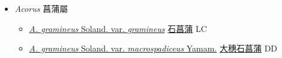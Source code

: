 
  \begin{itemize}
 \item[] \textit{Acorus} 菖蒲屬
                    
  \begin{itemize}
        \item[] \href{http://www.theplantlist.org/tpl1.1/search?q=Acorus+gramineus+var.+gramineus}{\textit{A. gramineus} Soland. var. \textit{gramineus}}   \href{\detokenize{http://taibnet.sinica.edu.tw/chi/taibnet_species_list.php?T2=石菖蒲&T2_new_value=true&fr=y}}{石菖蒲} LC
        \item[] \href{http://www.theplantlist.org/tpl1.1/search?q=Acorus+gramineus+var.+macrospadiceus}{\textit{A. gramineus} Soland. var. \textit{macrospadiceus} Yamam.}   \href{\detokenize{http://taibnet.sinica.edu.tw/chi/taibnet_species_list.php?T2=大穗石菖蒲&T2_new_value=true&fr=y}}{大穗石菖蒲} DD
  \end{itemize}
  \end{itemize}
